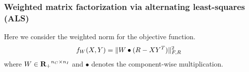 \subsubsection{Weighted matrix factorization via alternating least-squares (ALS)}

Here we consider the weighted norm for the objective function.
\begin{equation}
f_W(X,Y) = \|W\bullet(R - XY^T)\|_{F,R}^2
\end{equation}
where $W\in{\mathbf{R}_+}^{{n_C}\times{n_I}}$
and $\bullet$ denotes the component-wise multiplication.

%
%
